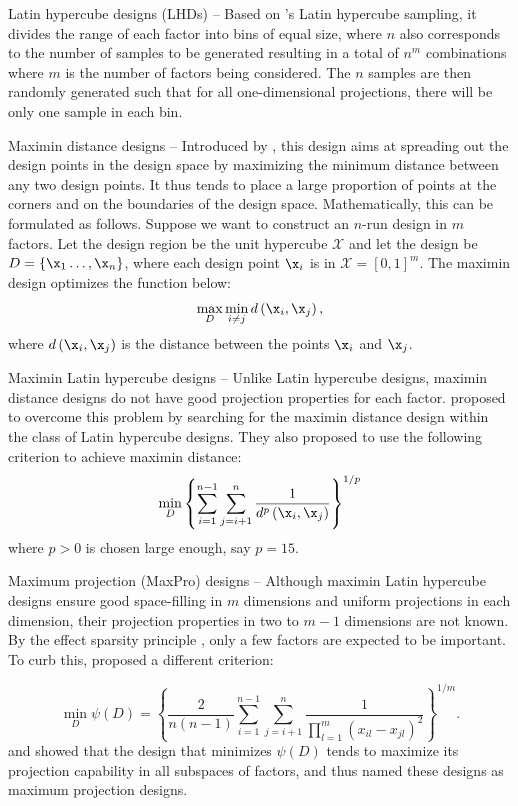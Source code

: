 \documentclass [PhD] {package/uclathes}
\begin{document}
\begin{description}
  \item Latin hypercube designs (LHDs) -- Based on \textcite{mckay1992latin}'s Latin hypercube sampling, it divides the range of each factor into  bins of equal size, where $n$ also corresponds to the number of samples to be generated resulting in a total of $n^m$ combinations where $m$ is the number of factors  being considered. The $n$ samples are then randomly generated such that for all one-dimensional projections, there will be only one sample in each bin.
  \item Maximin distance designs -- Introduced by \textcite{johnson1990minimax}, this design aims at spreading out the design points in the design space by maximizing the minimum  distance between any two design points. It thus tends to place a large proportion of points at the corners and on the boundaries of the design space. Mathematically, this can be formulated as follows. Suppose we want to construct an $n$-run design in $m$ factors. Let the design region be the unit hypercube $\mathcal{X}$ and let the design be $D=\left\{\x_1 \ldots, \x_n\right\}$, where each design point {$\x_{i}$} is in $\mathcal{X}=[0,1]^m$. The maximin design optimizes the function below:
$$
\max _D \min _{i \ne j} d\left(\x_i, \x_j\right),
$$
where $d\left(\x_i, \x_j\right)$ is the  distance between the points $\x_i$ and $\x_j$.
  \item Maximin Latin hypercube designs -- Unlike Latin hypercube designs,  maximin distance designs do not have good projection properties for each factor. \textcite{morris1995exploratory} proposed to overcome this problem by searching for the maximin distance design within the class of Latin hypercube designs. They also proposed to use the following criterion to achieve maximin distance:
\begin{equation}
\min _D\left\{\sum_{i=1}^{n-1} \sum_{j=i+1}^n \frac{1}{d^p\left(\x_i, \x_j\right)}\right\}^{1 / p}
\label{morris_mitchelle}
\end{equation}
where $p > 0$ is chosen large enough, say $p=15$.

  \item Maximum projection (MaxPro) designs  -- Although maximin Latin hypercube designs ensure good space-filling in $m$ dimensions and uniform projections in each dimension, their projection properties in two to $m - 1$ dimensions are not known. By the effect sparsity principle \parencite{wu2011experiments}, only a few factors are expected to be important. To curb this, \textcite{joseph2015maximum} proposed a different criterion:

\begin{equation}
\min _D \psi(D)=\left\{\frac{2}{n(n-1)} \sum_{i=1}^{n-1} \sum_{j=i+1}^n \frac{1}{\prod_{l=1}^m\left(x_{i l}-x_{j l}\right)^2}\right\}^{1 / m} .
\end{equation}
and showed that the design that minimizes $\psi(D)$ tends to maximize its projection capability in all subspaces of factors, and thus named these designs as maximum projection designs.
\end{description}
\end{document}
